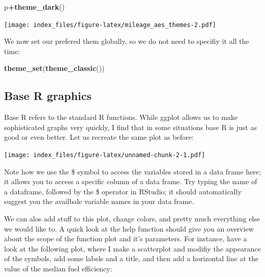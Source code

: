 \documentclass[]{article}
\newenvironment{Shaded}{\begin{snugshade}}{\end{snugshade}}
\newcommand{\KeywordTok}[1]{\textcolor[rgb]{0.13,0.29,0.53}{\textbf{#1}}}
\newcommand{\NormalTok}[1]{#1}
\newcommand{\OperatorTok}[1]{\textcolor[rgb]{0.81,0.36,0.00}{\textbf{#1}}}
\begin{document}
\begin{Shaded}
\begin{Highlighting}[]
\NormalTok{p}\OperatorTok{+}\KeywordTok{theme_dark}\NormalTok{()}
\end{Highlighting}
\end{Shaded}

\texttt{[image: index\_files/figure-latex/mileage\_aes\_themes-2.pdf]}

We now set our prefered them globally, so we do not need to specifiy it
all the time:

\begin{Shaded}
\begin{Highlighting}[]
\KeywordTok{theme_set}\NormalTok{(}\KeywordTok{theme_classic}\NormalTok{())}
\end{Highlighting}
\end{Shaded}

\hypertarget{base-r-graphics}{%
\subsection{Base R graphics}\label{base-r-graphics}}

Base R refers to the standard R functions. While ggplot allows us to
make sophisticated graphs very quickly, I find that in some situations
base R is just as good or even better. Let us recreate the same plot as
before:

\begin{Shaded}
\end{Shaded}

\texttt{[image: index\_files/figure-latex/unnamed-chunk-2-1.pdf]}

Note how we use the \$ symbol to access the variables stored in a data
frame here; it allows you to access a specific column of a data frame.
Try typing the name of a dataframe, followed by the \$ operator in
RStudio; it should automatically suggest you the availbale variable
names in your data frame.

We can alos add stuff to this plot, change colors, and pretty much
everything else we would like to. A quick look at the help function
should give you an overview about the scope of the function plot and
it's parameters. For instance, have a look at the following plot, where
I make a scatterplot and modifiy the appearance of the symbols, add some
labels and a title, and then add a horizontal line at the value of the
median fuel efficiency:
\end{document}
